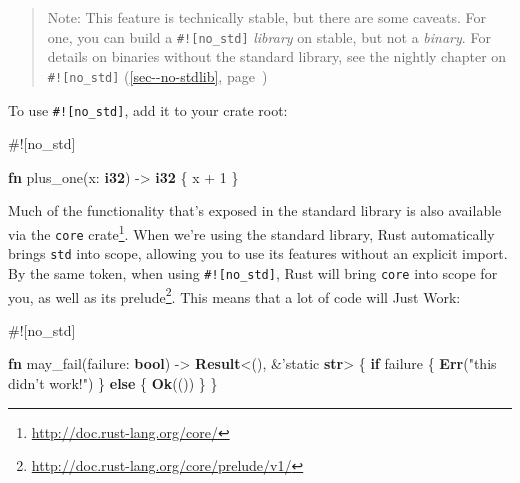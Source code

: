 \documentclass[a4paper,]{book}
\renewcommand*{\hyperref}[2][\ar]{%
  \def\ar{#2}%
  #2 (\autoref{#1}, page~\pageref{#1})}
\newenvironment{Shaded}{\begin{snugshade}}{\end{snugshade}}
\newcommand{\KeywordTok}[1]{\textcolor[rgb]{0.13,0.29,0.53}{\textbf{{#1}}}}
\newcommand{\DecValTok}[1]{\textcolor[rgb]{0.00,0.00,0.81}{{#1}}}
\newcommand{\StringTok}[1]{\textcolor[rgb]{0.31,0.60,0.02}{{#1}}}
\newcommand{\OtherTok}[1]{\textcolor[rgb]{0.56,0.35,0.01}{{#1}}}
\newcommand{\NormalTok}[1]{{#1}}
\renewcommand{\href}[2]{#2\footnote{\url{#1}}}
\begin{document}
\begin{quote}
Note: This feature is technically stable, but there are some caveats.
For one, you can build a \texttt{\#!{[}no\_std{]}} \emph{library} on
stable, but not a \emph{binary}. For details on binaries without the
standard library, see \hyperref[sec--no-stdlib]{the nightly chapter on
\texttt{\#!{[}no\_std{]}}}
\end{quote}

To use \texttt{\#!{[}no\_std{]}}, add it to your crate root:

\begin{Shaded}
\begin{Highlighting}[]
\NormalTok{#![no_std]}

\KeywordTok{fn} \NormalTok{plus_one(x: }\KeywordTok{i32}\NormalTok{) -> }\KeywordTok{i32} \NormalTok{\{}
    \NormalTok{x + }\DecValTok{1}
\NormalTok{\}}
\end{Highlighting}
\end{Shaded}

Much of the functionality that's exposed in the standard library is also
available via the \href{http://doc.rust-lang.org/core/}{\texttt{core}
crate}. When we're using the standard library, Rust automatically brings
\texttt{std} into scope, allowing you to use its features without an
explicit import. By the same token, when using
\texttt{\#!{[}no\_std{]}}, Rust will bring \texttt{core} into scope for
you, as well as \href{http://doc.rust-lang.org/core/prelude/v1/}{its
prelude}. This means that a lot of code will Just Work:

\begin{Shaded}
\begin{Highlighting}[]
\NormalTok{#![no_std]}

\KeywordTok{fn} \NormalTok{may_fail(failure: }\KeywordTok{bool}\NormalTok{) -> }\KeywordTok{Result}\NormalTok{<(), &}\OtherTok{'static} \KeywordTok{str}\NormalTok{> \{}
    \KeywordTok{if} \NormalTok{failure \{}
        \KeywordTok{Err}\NormalTok{(}\StringTok{"this didn’t work!"}\NormalTok{)}
    \NormalTok{\} }\KeywordTok{else} \NormalTok{\{}
        \KeywordTok{Ok}\NormalTok{(())}
    \NormalTok{\}}
\NormalTok{\}}
\end{Highlighting}
\end{Shaded}

\end{document}
